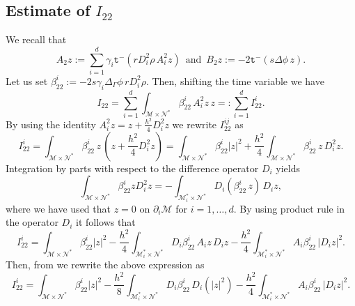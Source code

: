\documentclass[11pt,oneside,leqno]{amsart}
\numberwithin{equation}{section}
\numberwithin{equation}{section}
\newcommand{\trm}{\mathtt t^-}
\begin{document}
\subsection{Estimate of $I_{22}$ \label{lem:I22}}
 We recall that 
\begin{equation}
    A_{2}z:=\sum_{i=1}^{d}\gamma_{i}\trm(rD_{i}^{2}\rho\,A_{i}^{2}z)
\,\text{  and  }\,
    B_{2}z:=-2\trm(s\Delta\phi\,z).
\end{equation}
Let us set $\beta_{22}^{i}:=-2s\gamma_{i}\Delta_{\Gamma} \phi\,rD_{i}^{2}\rho$. Then, shifting the time variable we have
\begin{equation}
I_{22}=\sum_{i=1}^{d}\int_{\mathcal{M}\times\mathcal{N}^{\ast}} \beta_{22}^{i}\,A_{i}^{2}z\,z=:\sum_{i=1}^{d}I_{22}^{i}.
\end{equation}
By using the identity $A_{i}^{2}z=z+\frac{h^{2}}{4}D_{i}^{2}z$ we rewrite $I_{22}^{ij}$ as
\begin{equation}
   I_{22}^{i}=\int_{\mathcal{M}\times\mathcal{N}^{\ast}} \beta_{22}^{i}\,z\,\left(z+\frac{h^{2}}{4}D_{i}^{2}z\right)
    =\int_{\mathcal{M}\times\mathcal{N}^{\ast}} \beta_{22}^{i}|z|^{2}+\frac{h^{2}}{4}\int_{\mathcal{M}\times\mathcal{N}^{\ast}} \beta_{22}^{i}\,z\,D_{i}^{2}z.
\end{equation}
Integration by parts with respect to the difference operator $D_{i}$ yields 
\begin{equation}
    \int_{\mathcal{M}\times\mathcal{N}^{\ast}}\beta_{22}^{i}zD_{i}^{2}z=-\int_{\mathcal{M}_{i}^{\ast}\times\mathcal{N}^{\ast}}D_{i}(\beta_{22}^{i}\,z)\,D_{i}z,
\end{equation}
where we have used that $z=0$ on $\partial_{i}\mathcal{M}$ for $i=1,\ldots,d$. By using product rule in the operator $D_{i}$ \cite[Lemma 2.1, equation (13)]{LDOP-2021} it follows that
\begin{equation}
    I_{22}^{i}=\int_{\mathcal{M}\times\mathcal{N}^{\ast}} \beta_{22}^{i}|z|^{2}-\frac{h^{2}}{4}\int_{\mathcal{M}_{i}^{\ast}\times\mathcal{N}^{\ast}}D_{i}\beta_{22}^{i}\,A_{i}z\,D_{i}z-\frac{h^{2}}{4}\int_{\mathcal{M}_{i}^{\ast}\times\mathcal{N}^{\ast}}A_{i}\beta_{22}^{i}\,|D_{i}z|^{2}.
\end{equation}
Then, from \cite[Lemma 2.1, equation (13)]{LDOP-2021} we rewrite the above expression as
\begin{equation}
I_{22}^{i}=\int_{\mathcal{M}\times\mathcal{N}^{\ast}} \beta_{22}^{i}|z|^{2}-\frac{h^{2}}{8}\int_{\mathcal{M}_{i}^{\ast}\times\mathcal{N}^{\ast}}D_{i}\beta_{22}^{i}\,D_{i}(|z|^{2})-\frac{h^{2}}{4}\int_{\mathcal{M}_{i}^{\ast}\times\mathcal{N}^{\ast}}A_{i}\beta_{22}^{i}\,|D_{i}z|^{2}.
\end{equation}
\end{document}
